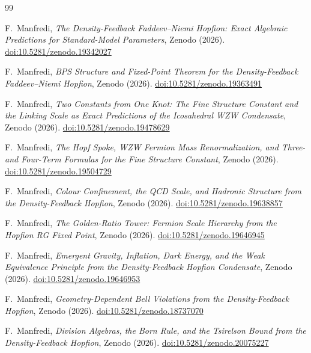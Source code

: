 \documentclass[11pt,a4paper]{article}
\begin{document}
\begin{thebibliography}{99}

F.~Manfredi,
\textit{The Density-Feedback Faddeev--Niemi Hopfion:
  Exact Algebraic Predictions for Standard-Model Parameters},
Zenodo (2026).
\href{https://doi.org/10.5281/zenodo.19342027}{doi:10.5281/zenodo.19342027}

F.~Manfredi,
\textit{BPS Structure and Fixed-Point Theorem for the
  Density-Feedback Faddeev--Niemi Hopfion},
Zenodo (2026).
\href{https://doi.org/10.5281/zenodo.19363491}{doi:10.5281/zenodo.19363491}

F.~Manfredi,
\textit{Two Constants from One Knot: The Fine Structure Constant and
  the Linking Scale as Exact Predictions of the Icosahedral WZW Condensate},
Zenodo (2026).
\href{https://doi.org/10.5281/zenodo.19478629}{doi:10.5281/zenodo.19478629}

F.~Manfredi,
\textit{The Hopf Spoke, WZW Fermion Mass Renormalization,
  and Three- and Four-Term Formulas for the Fine Structure Constant},
Zenodo (2026).
\href{https://doi.org/10.5281/zenodo.19504729}{doi:10.5281/zenodo.19504729}

F.~Manfredi,
\textit{Colour Confinement, the QCD Scale, and Hadronic Structure
  from the Density-Feedback Hopfion},
Zenodo (2026).
\href{https://doi.org/10.5281/zenodo.19638857}{doi:10.5281/zenodo.19638857}

F.~Manfredi,
\textit{The Golden-Ratio Tower: Fermion Scale Hierarchy from the Hopfion RG Fixed Point},
Zenodo (2026).
\href{https://doi.org/10.5281/zenodo.19646945}{doi:10.5281/zenodo.19646945}

F.~Manfredi,
\textit{Emergent Gravity, Inflation, Dark Energy, and the Weak
  Equivalence Principle from the Density-Feedback Hopfion Condensate},
Zenodo (2026).
\href{https://doi.org/10.5281/zenodo.19646953}{doi:10.5281/zenodo.19646953}

F.~Manfredi,
\textit{Geometry-Dependent Bell Violations from the Density-Feedback Hopfion},
Zenodo (2026).
\href{https://doi.org/10.5281/zenodo.18737070}{doi:10.5281/zenodo.18737070}

F.~Manfredi,
\textit{Division Algebras, the Born Rule, and the Tsirelson Bound
  from the Density-Feedback Hopfion},
Zenodo (2026).
\href{https://doi.org/10.5281/zenodo.20075227}{doi:10.5281/zenodo.20075227}


\end{thebibliography}
\end{document}
